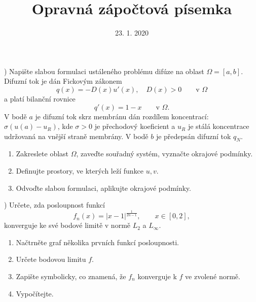 \documentclass{article}
\begin{document}
\title{Opravná zápočtová písemka}
\date{23. 1. 2020}
\author{}
\maketitle

) \hspace{0.5cm}
Napište slabou formulaci ustáleného problému difúze na oblast $\Omega=[a,b]$.\\
Difuzní tok je dán Fickovým zákonem
\[
    q(x) = -D(x)u'(x), \quad D(x)>0 \qquad \textrm{v }\Omega
\]
a platí bilanční rovnice
\[
    q'(x) = 1-x \qquad \textrm{v }\Omega.
\]
\noindent
V bodě $a$ je difuzní tok skrz membránu dán rozdílem koncentrací: $\sigma(u(a)-u_R)$, kde
$\sigma>0$ je přechodový koeficient a $u_R$ je stálá koncentrace udržovaná na vnější straně membrány.
V bodě $b$ je předepsán difuzní tok $q_N$.

\vspace{1cm}
\begin{enumerate}
\item Zakreslete oblast $\Omega$, zaveďte souřadný systém, vyznačte okrajové podmínky.
\item Definujte prostory, ve kterých leží funkce $u,v$.
\item Odvoďte slabou formulaci, aplikujte okrajové podmínky.
\end{enumerate}




\vspace{2cm}

) \hspace{0.5cm}
Určete, zda posloupnost funkcí
\[
f_n(x) = |x-1|^{\frac{1}{2n-1}}, \qquad x\in[0,2],
\]
konverguje ke své bodové limitě v normě $L_2$ a $L_\infty$.

\vspace{1cm}
\begin{enumerate}
\item Načtrněte graf několika prvních funkcí posloupnosti.
\item Určete bodovou limitu $f$.
\item Zapište symbolicky, co znamená, že $f_n$ konverguje k $f$ ve zvolené normě.
\item Vypočítejte.
\end{enumerate}
\end{document}
